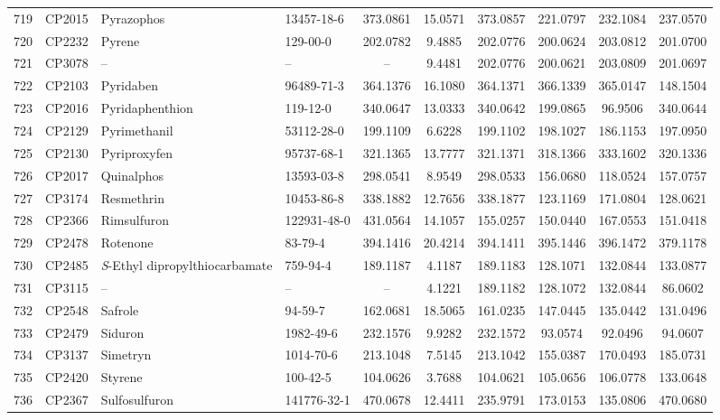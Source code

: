 \begin{longtable}{clllcccccc}
719 & CP2015 & Pyrazophos & 13457-18-6 & 373.0861 & 15.0571 & 373.0857 & 221.0797 & 232.1084 & 237.0570 \\ 
720 & CP2232 & Pyrene & 129-00-0 & 202.0782 & 9.4885 & 202.0776 & 200.0624 & 203.0812 & 201.0700 \\ 
721 & CP3078 & – & – & – & 9.4481 & 202.0776 & 200.0621 & 203.0809 & 201.0697 \\ 
722 & CP2103 & Pyridaben & 96489-71-3 & 364.1376 & 16.1080 & 364.1371 & 366.1339 & 365.0147 & 148.1504 \\ 
723 & CP2016 & Pyridaphenthion & 119-12-0 & 340.0647 & 13.0333 & 340.0642 & 199.0865 & 96.9506 & 340.0644 \\ 
724 & CP2129 & Pyrimethanil & 53112-28-0 & 199.1109 & 6.6228 & 199.1102 & 198.1027 & 186.1153 & 197.0950 \\ 
725 & CP2130 & Pyriproxyfen & 95737-68-1 & 321.1365 & 13.7777 & 321.1371 & 318.1366 & 333.1602 & 320.1336 \\ 
726 & CP2017 & Quinalphos & 13593-03-8 & 298.0541 & 8.9549 & 298.0533 & 156.0680 & 118.0524 & 157.0757 \\ 
727 & CP3174 & Resmethrin & 10453-86-8 & 338.1882 & 12.7656 & 338.1877 & 123.1169 & 171.0804 & 128.0621 \\ 
728 & CP2366 & Rimsulfuron & 122931-48-0 & 431.0564 & 14.1057 & 155.0257 & 150.0440 & 167.0553 & 151.0418 \\ 
729 & CP2478 & Rotenone & 83-79-4 & 394.1416 & 20.4214 & 394.1411 & 395.1446 & 396.1472 & 379.1178 \\ 
730 & CP2485 & \textit{S}-Ethyl dipropylthiocarbamate & 759-94-4 & 189.1187 & 4.1187 & 189.1183 & 128.1071 & 132.0844 & 133.0877 \\ 
731 & CP3115 & – & – & – & 4.1221 & 189.1182 & 128.1072 & 132.0844 & 86.0602 \\ 
732 & CP2548 & Safrole & 94-59-7 & 162.0681 & 18.5065 & 161.0235 & 147.0445 & 135.0442 & 131.0496 \\ 
733 & CP2479 & Siduron & 1982-49-6 & 232.1576 & 9.9282 & 232.1572 & 93.0574 & 92.0496 & 94.0607 \\ 
734 & CP3137 & Simetryn & 1014-70-6 & 213.1048 & 7.5145 & 213.1042 & 155.0387 & 170.0493 & 185.0731 \\ 
735 & CP2420 & Styrene & 100-42-5 & 104.0626 & 3.7688 & 104.0621 & 105.0656 & 106.0778 & 133.0648 \\ 
736 & CP2367 & Sulfosulfuron & 141776-32-1 & 470.0678 & 12.4411 & 235.9791 & 173.0153 & 135.0806 & 470.0680 \\ 

\end{longtable}
